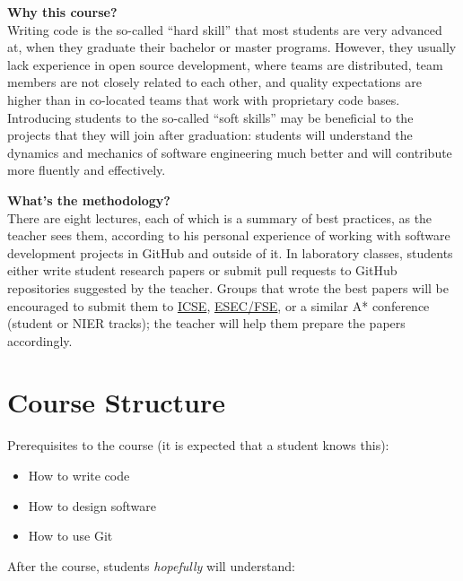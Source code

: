 \documentclass[nobrand,anonymous,nodate,nosecurity]{huawei}
\begin{document}
{\textbf{Why this course?}\\
Writing code is the so-called ``hard skill'' that most students are
very advanced at, when they graduate their bachelor or master programs.
However, they usually lack experience in open source development, where
teams are distributed, team members are not closely related to each other,
and quality expectations are higher than in co-located teams that
work with proprietary code bases. Introducing students to the so-called
``soft skills'' may be beneficial to the projects that they will join
after graduation: students will understand the dynamics and mechanics
of software engineering much better and will contribute more fluently
and effectively.

\textbf{What's the methodology?}\\
There are eight lectures, each of which is a summary of best practices,
as the teacher sees them, according to his personal experience of
working with software development projects in GitHub and outside of it.
In laboratory classes, students either write student research papers
or submit pull requests to GitHub repositories suggested by the teacher.
Groups that wrote the best papers will be encouraged to submit them
to \href{http://www.icse-conferences.org/}{ICSE},
\href{https://www.esec-fse.org/}{ESEC/FSE}, or a similar A* conference
(student or NIER tracks); the teacher will help them prepare the papers
accordingly.

\newpage
\section*{Course Structure}

Prerequisites to the course (it is expected that a student knows this):

\begin{itemize}
\item How to write code
\item How to design software
\item How to use Git
\end{itemize}

After the course, students \emph{hopefully} will understand:

}
\end{document}
